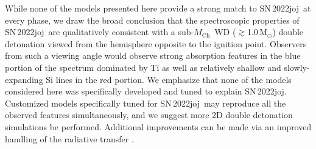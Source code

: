 \documentclass[twocolumn]{aastex631}
\newcommand{\sn}{SN\,2022joj}
\newcommand{\Mch}{$M_\mathrm{Ch}$}
\begin{document}
\begin{CJK*}{UTF8}{gbsn}

While none of the models presented here provide a strong match to \sn\ at every phase, we draw the broad conclusion that the spectroscopic properties of \sn\ are qualitatively consistent with a sub-\Mch\ WD ($\gtrsim$1.0\,$\mathrm{M_\odot}$) double detonation viewed from the hemisphere opposite to the ignition point. Observers from such a viewing angle would observe strong absorption features in the blue portion of the spectrum dominated by Ti as well as relatively shallow and slowly-expanding Si lines in the red portion. We emphasize that none of the models considered here was specifically developed and tuned to explain \sn. Customized models specifically tuned for \sn\ may reproduce all the observed features simultaneously, and we suggest more 2D double detonation simulations be performed. Additional improvements can be made via an improved handling of the radiative transfer \citep[e.g., non-LTE effects; see][]{Shen_NLTE_2021}.


\end{CJK*}
\end{document}
